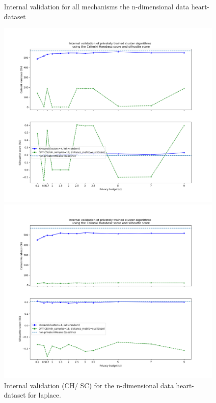 \begin{figure}[H]
    \caption{Internal validation for all mechanisms the n-dimensional data heart-dataset}
    \centering
    \begin{minipage}[c]{0.49\textwidth}
        \includegraphics[width=1\textwidth]{Results/nd-laplace/heart-dataset/ch-and-sc.png}
        \caption{Internal validation (CH/ SC) for the n-dimensional data heart-dataset for laplace.}
        \label{fig:appendix-internal-validation-heart-dataset_comparison_nd-laplace}
    \end{minipage}
    \begin{minipage}[c]{0.49\textwidth}
        \includegraphics[width=1\textwidth]{Results/nd-laplace-truncated/heart-dataset/ch-and-sc.png}

\end{minipage}
\end{figure}
